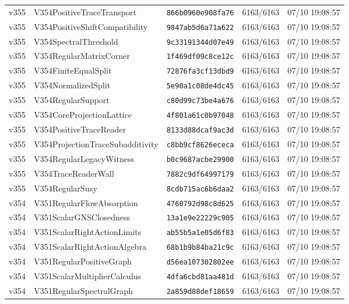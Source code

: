 \documentclass[11pt]{article}
\theoremstyle{definition}\newtheorem{deriv}{Derivation}
\begin{document}
{\begin{longtable}{@{}lllll@{}}
v355 & V354PositiveTraceTransport & \texttt{866b0960e908fa76} & 6163/6163 & 07/10 19:08:57 \\
v355 & V354PositiveShiftCompatibility & \texttt{9847ab5d6a71a622} & 6163/6163 & 07/10 19:08:57 \\
v355 & V354SpectralThreshold & \texttt{9c33191344d07e49} & 6163/6163 & 07/10 19:08:57 \\
v355 & V354RegularMatrixCorner & \texttt{1f469df09c8ce12c} & 6163/6163 & 07/10 19:08:57 \\
v355 & V354FiniteEqualSplit & \texttt{72876fa3cf13dbd9} & 6163/6163 & 07/10 19:08:57 \\
v355 & V354NormalizedSplit & \texttt{5e90a1c08de4dc45} & 6163/6163 & 07/10 19:08:57 \\
v355 & V354RegularSupport & \texttt{c80d99c73be4a676} & 6163/6163 & 07/10 19:08:57 \\
v355 & V354CoreProjectionLattice & \texttt{4f801a61c0b97048} & 6163/6163 & 07/10 19:08:57 \\
v355 & V354PositiveTraceReader & \texttt{8133d88dcaf9ac3d} & 6163/6163 & 07/10 19:08:57 \\
v355 & V354ProjectionTraceSubadditivity & \texttt{c8bb9cf8626ececa} & 6163/6163 & 07/10 19:08:57 \\
v355 & V354RegularLegacyWitness & \texttt{b0c9687acbe29900} & 6163/6163 & 07/10 19:08:57 \\
v355 & V354TraceReaderWall & \texttt{7882c9df64997179} & 6163/6163 & 07/10 19:08:57 \\
v355 & V354RegularSusy & \texttt{8cdb715ac6b6daa2} & 6163/6163 & 07/10 19:08:57 \\
v354 & V351RegularFlowAbsorption & \texttt{4760792d98c8d625} & 6163/6163 & 07/10 19:08:57 \\
v354 & V351ScalarGNSClosedness & \texttt{13a1e9e22229c905} & 6163/6163 & 07/10 19:08:57 \\
v354 & V351ScalarRightActionLimits & \texttt{ab55b5a1e05d6f83} & 6163/6163 & 07/10 19:08:57 \\
v354 & V351ScalarRightActionAlgebra & \texttt{68b1b9b84ba21c9c} & 6163/6163 & 07/10 19:08:57 \\
v354 & V351RegularPositiveGraph & \texttt{d56ea107302802ee} & 6163/6163 & 07/10 19:08:57 \\
v354 & V351ScalarMultiplierCalculus & \texttt{4dfa6cbd81aa481d} & 6163/6163 & 07/10 19:08:57 \\
v354 & V351RegularSpectralGraph & \texttt{2a859d88def18659} & 6163/6163 & 07/10 19:08:57 \\

\end{longtable}}
\end{document}

